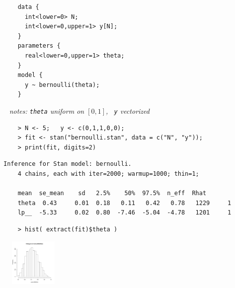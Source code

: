 \documentclass[10pt]{report}
\newcommand{\sld}[1]{\newpage{\noindent\LARGE \ \ \
    \textcolor{MidnightBlue}{\bfseries #1}}\vspace*{4pt}}
\newcommand{\spc}{\hspace*{0.25in}}
\begin{document}
\sld{Example: \ Bernoulli}
\vfill
\spc\spc
\begin{minipage}[t]{0.8\textwidth}
  \begin{Verbatim}
    data {
      int<lower=0> N;
      int<lower=0,upper=1> y[N];
    }
    parameters {
      real<lower=0,upper=1> theta;
    } 
    model {
      y ~ bernoulli(theta);
    }
  \end{Verbatim}
\end{minipage}
\vfill
\vfill
\vfill
\mbox{ } \hfill {\small\slshape notes: {\tt theta} uniform on $[0,1]$, \ {\tt y} vectorized}
\vfill


\sld{RStan Execution}

\begin{minipage}[t]{\textwidth}
  \footnotesize
  \begin{Verbatim}
    > N <- 5;   y <- c(0,1,1,0,0);
    > fit <- stan("bernoulli.stan", data = c("N", "y"));
    > print(fit, digits=2)
  \end{Verbatim}
  \vspace*{1pt}
  \begin{Verbatim}[fontshape=sl]
    Inference for Stan model: bernoulli.
    4 chains, each with iter=2000; warmup=1000; thin=1; 

    mean  se_mean    sd   2.5%    50%  97.5%  n_eff  Rhat
    theta  0.43     0.01  0.18   0.11   0.42   0.78   1229     1
    lp__  -5.33     0.02  0.80  -7.46  -5.04  -4.78   1201     1
  \end{Verbatim}
  \vspace*{6pt}
  \begin{Verbatim}
    > hist( extract(fit)$theta )
  \end{Verbatim}
  \vspace*{-24pt}
  \hfill\includegraphics[width=1.25in,height=0.9in]{img/bernoulli-posterior-histo.pdf}
  \hspace*{24pt}
\end{minipage}


\sld{Basic Program Blocks}
\end{document}
